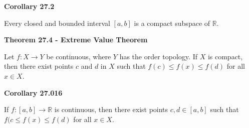 \documentclass{article}
\begin{document}
\medskip\noindent\textbf{Corollary 27.2}

    Every closed and bounded interval $[a,b]$ is a compact subspace of $\mathbb R$.

\medskip\noindent\textbf{Theorem 27.4 - Extreme Value Theorem}

    Let $f: X \to Y$ be continuous, where $Y$ has the order topology. If $X$ is compact, then there exist points $c$ and $d$ in $X$ such that $f(c) \leq f(x) \leq f(d)$ for all $x \in X$.

\medskip\noindent\textbf{Corollary 27.016}

    If $f: [a,b] \to \mathbb R$ is continuous, then there exist points $c,d \in [a,b]$ such that $f(c \leq f(x) \leq f(d)$ for all $x \in X$.
 
\end{document}
